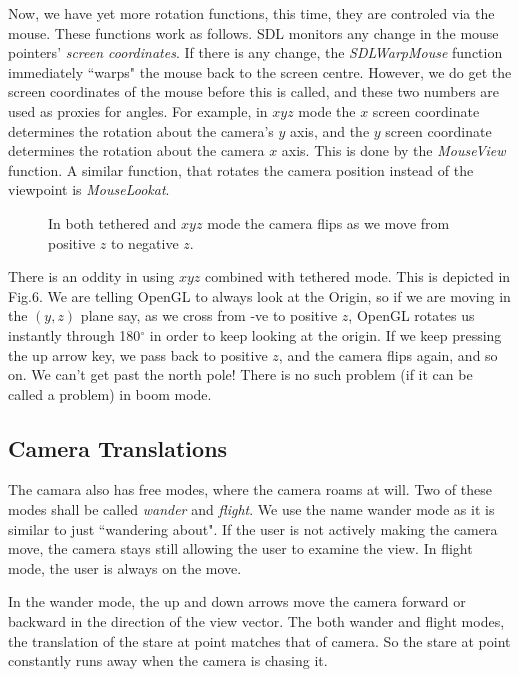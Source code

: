 \documentclass[12pt]{article}
\begin{document}
Now, we have yet more rotation functions, this time, they are controled via
the mouse. These functions work as follows. SDL monitors any change in the 
mouse pointers' {\it screen coordinates}. If there is any change, the {\it SDLWarpMouse}
function immediately ``warps" the mouse back to the screen centre. However,
 we do get the screen coordinates of the mouse before this is called, and these
two numbers are used as proxies for angles. For example, in $xyz$ mode
the $x$ screen coordinate determines
the rotation about the camera's $y$ axis, and the $y$ screen coordinate determines
the rotation about the camera $x$ axis. This is done by the {\it MouseView} function.
A similar function, that rotates the camera position instead of the viewpoint is
{\it MouseLookat}.

\begin{figure}[htb]
\vspace*{10cm}
\caption{ 
In both tethered and  $xyz$ mode the camera flips as we move from positive
$z$ to negative $z$.
}
\end{figure}
There is an oddity in using $xyz$ combined with tethered  mode. This is depicted 
in Fig.6. We are telling
OpenGL to always look at the Origin, so if we are moving in the $(y,z)$ plane say,
 as we cross from -ve to positive $z$, OpenGL rotates us instantly through 180$^\circ$
in order to keep looking at the origin. If we keep pressing the up arrow key, we pass back
to positive $z$, and the camera flips again, and so on. We can't get past
the north pole! There is no such problem (if it can be called a problem) 
in boom mode.

\subsection{Camera Translations}

The camara also has free modes, where the camera roams at will.
Two of these modes shall be called {\it wander} and {\it flight}.
We use the name wander mode as it is similar to just ``wandering about".
If the user is not actively making the camera move, the camera stays
still allowing the user to examine the view. In flight mode, the user
is always on the move.

In the wander mode, the up and down arrows move the camera forward
or backward in the direction of the view vector. The both
wander and flight modes, the  translation
of the stare at point matches that of camera. So the stare at point 
constantly runs away when the camera is chasing it.
\end{document}
